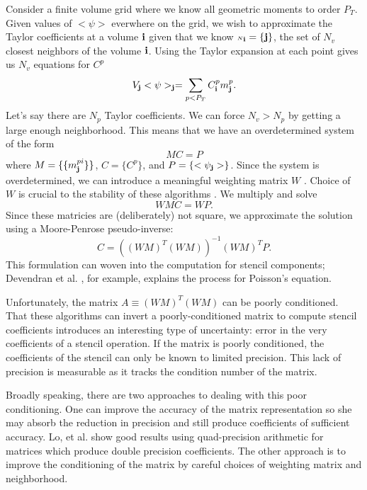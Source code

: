 \documentclass{article}
\newcommand{\ibold}{{\bf i}}
\newcommand{\jbold}{{\bf j}}
\newcommand{\cn}{{\scriptscriptstyle N}}
\begin{document}
Consider a finite volume grid where we know all geometric moments to
order $P_T$.  Given values of $<\psi>$ everwhere on the grid, we wish to
approximate the Taylor coefficients at a volume $\ibold$ given that we
know $\cn_\ibold = \{\jbold\}$, the set of $N_v$ closest neighbors of
the volume $\ibold$.  Using the Taylor expansion at each point gives
us $N_v$ equations for $C^p$
\begin{equation}
  V_\jbold <\psi>_\jbold = \sum\limits_{p < P_T} C^p_\ibold m^p_\jbold.
\end{equation}
Let's say there are $N_p$ Taylor coefficients.  We can force $N_v >
N_p$ by getting a large enough neighborhood.  This means that we have
an overdetermined system of the form
\begin{equation*}
M C = P 
\end{equation*}
where $M = \{\{m^{pi}_\jbold\}\}$, $C=\{C^p\}$,  and $P= \{<\psi_\jbold>\}$.
Since the system is overdetermined, we can introduce a 
meaningful weighting matrix $W$ \footnotemark[3].  Choice of $W$
is crucial to the stability of these algorithms
\footnotemark[4].
We multiply and solve
\begin{equation*}
WMC = WP.
\end{equation*}
Since these matricies are (deliberately) not square, we approximate
the solution using a Moore-Penrose pseudo-inverse:
\begin{equation}
  C = ((WM)^T(WM))^{-1} (WM)^T P.
\label{eqn::getC}  
\end{equation}
This formulation can woven into the computation for stencil
components;  Devendran et al. \cite{Devendran2017}, for example, explains the
process for Poisson's equation.

Unfortunately, the matrix $A \equiv (WM)^T(WM)$ can be poorly conditioned.
That these algorithms can invert a poorly-conditioned matrix to compute
stencil coefficients introduces an interesting type of uncertainty: error in
the very coefficients of a stencil operation.   If the matrix is poorly
conditioned, the coefficients of the stencil can only be known to
limited precision.   This lack of precision is measurable as it tracks
the condition number of the matrix.

Broadly speaking, there are two approaches to dealing with this poor
conditioning. One can improve the accuracy of the matrix
representation so she may absorb the reduction in precision and still
produce coefficients of sufficient accuracy.
Lo, et al. \cite{Lo2019} show good results using quad-precision arithmetic
for matrices which produce double precision coefficients.
The other approach is to improve the
conditioning of the matrix by careful choices of weighting matrix and
neighborhood.  
\end{document}
